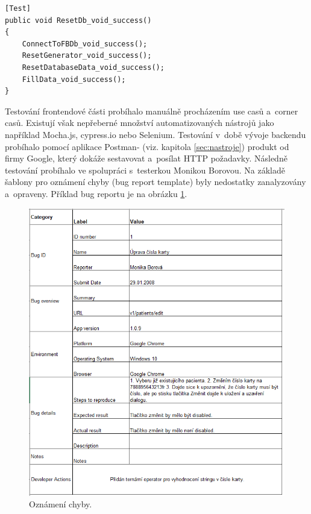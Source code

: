 \begin{lstlisting}[numbers=none, caption={Vrácení databáze do původního stavu.}, label=lst:resetDB]
[Test]
public void ResetDb_void_success()
{
	ConnectToFBDb_void_success();
	ResetGenerator_void_success();
	ResetDatabaseData_void_success();
	FillData_void_success();
}
\end{lstlisting}

Testování frontendové části probíhalo manuálně procházením use casů a~corner casů. Existují však nepřeberné množství automatizovaných nástrojů jako například Mocha.js, cypress.io nebo Selenium. Testování v~době vývoje backendu probíhalo pomocí aplikace Postman- (viz. kapitola \ref{sec:nastroje}) produkt od firmy Google, který dokáže sestavovat a~posílat HTTP požadavky. Následně testování probíhalo ve spolupráci s~testerkou Monikou Borovou. Na základě šablony pro oznámení chyby (bug report template) byly nedostatky zanalyzovány a~opraveny. Příklad bug reportu je na obrázku \ref{fig:bugReport}. 


\begin{figure} [H]
	\includegraphics[width=15cm]{../bugReport.png}
	\caption{Oznámení chyby.}
	\label{fig:bugReport}
\end{figure}

